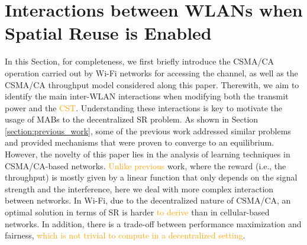 \documentclass[preprint,12pt]{elsarticle}
\begin{document}
\section{Interactions between WLANs when Spatial Reuse is Enabled}
\label{section:interactions_wlans}    
In this Section, for completeness, we first briefly introduce the CSMA/CA operation carried out by Wi-Fi networks for accessing the channel, as well as the CSMA/CA throughput model considered along this paper. Therewith, we aim to identify the main inter-WLAN interactions when modifying both the transmit power and the \textcolor{orange}{CST}. Understanding these interactions is key to motivate the usage of MABs to the decentralized SR problem. As shown in Section \ref{section:previous_work}, some of the previous work addressed similar problems and provided mechanisms that were proven to converge to an equilibrium. However, the novelty of this paper lies in the analysis of learning techniques in CSMA/CA-based networks. \textcolor{orange}{Unlike previous} work, where the reward (i.e., the throughput) is mostly given by a linear function that only depends on the signal strength and the interference, here we deal with more complex interaction between networks. In Wi-Fi, due to the decentralized nature of CSMA/CA, an optimal solution in terms of SR is harder \textcolor{orange}{to derive} than in cellular-based networks. In addition, there is a trade-off between performance maximization and fairness, \textcolor{orange}{which is not trivial to compute in a decentralized setting}.
	
\end{document}
